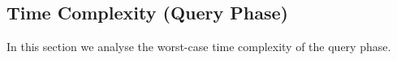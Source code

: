 \documentclass[a4paper]{report}
\begin{document}
%
%

\subsection{Time Complexity (Query Phase)}


\label{para:time}
In this section we analyse the worst-case time complexity of the query phase.
\end{document}
